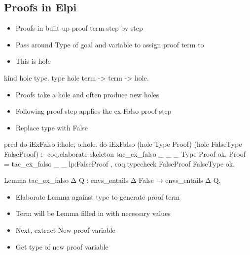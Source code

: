 \documentclass[thesis.tex]{subfiles}
\begin{document}
{\subsection{Proofs in Elpi}
\begin{itemize}
  \item Proofs in \elpi built up proof term step by step
  \item Pass around Type of goal and variable to assign proof term to
  \item This is hole
\end{itemize}
\begin{elpicode}
  kind hole type.
  type hole term -> term -> hole. %
\end{elpicode}
\begin{itemize}
  \item Proofs take a hole and often produce new holes
  \item Following proof step applies the ex Falso proof step
  \item Replace type with False
\end{itemize}
\begin{elpicode}
  pred do-iExFalso i:hole, o:hole.
  do-iExFalso (hole Type Proof) (hole FalseType FalseProof) :-
    coq.elaborate-skeleton {{ tac_ex_falso _ _ _ }} Type Proof ok,
    Proof = {{ tac_ex_falso _ _ lp:FalseProof }},
    coq.typecheck FalseProof FalseType ok.
\end{elpicode}
\begin{coqcode}
  Lemma tac_ex_falso Δ Q : envs_entails Δ False → envs_entails Δ Q.
\end{coqcode}
\begin{itemize}
  \item Elaborate Lemma against type to generate proof term
  \item Term will be Lemma filled in with necessary values
  \item Next, extract New proof variable
  \item Get type of new proof variable
\end{itemize}

}
\end{document}
